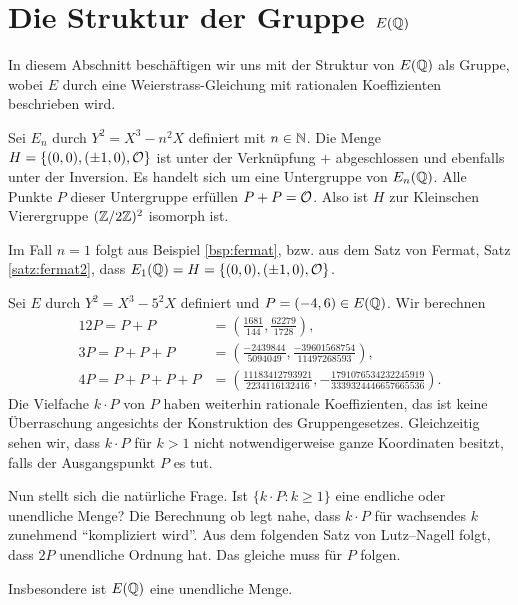 \section{Die Struktur der Gruppe $E({\mathbb{Q}})$}

In diesem Abschnitt beschäftigen wir uns mit der 
Struktur von $E({\mathbb{Q}})$ als Gruppe, wobei $E$ durch eine Weierstrass-Gleichung mit
rationalen Koeffizienten beschrieben wird. 


\begin{beispiel}
  \label{bsp:vierergruppe}
  Sei $E_n$ durch $Y^2 = X^3-n^2 X$ definiert mit $n\in{\mathbb{N}}$.
  Die Menge $H=\{(0,0),(\pm 1,0),{\mathcal O}\}$ ist unter der Verknüpfung $+$
  abgeschlossen
  und ebenfalls unter der Inversion.
  Es handelt sich um eine Untergruppe von $E_n({\mathbb{Q}})$.
  Alle
  Punkte $P$ dieser Untergruppe erfüllen $P+P={\mathcal O}$.  Also ist $H$ zur
  Kleinschen Vierergruppe $({\mathbb{Z}}/2{\mathbb{Z}})^2$ isomorph ist.
  
  Im Fall $n=1$ folgt aus Beispiel \ref{bsp:fermat}, bzw. aus dem Satz von Fermat, Satz
  \ref{satz:fermat2}, dass $E_1({\mathbb{Q}}) = H=  \{(0,0),(\pm 1,0),{\mathcal O}\}$. 
\end{beispiel}

\begin{beispiel}
  \label{bsp:multiplesofP}
  Sei $E$ durch $Y^2 = X^3-5^2X$ definiert und $P = (-4,6) \in
  E({\mathbb{Q}})$.
  Wir berechnen
  \begin{alignat*}1
    2P=P+P &= \left(\frac{1681}{144}, \frac{62279}{1728}\right),\\
    3P=P+P +P &= \left(\frac{-2439844}{5094049}, \frac{-39601568754}{11497268593} \right),\\
    4P= P+P +P+P &= \left( \frac{11183412793921}{2234116132416}, -\frac{1791076534232245919}{3339324446657665536}\right).
  \end{alignat*}
  Die Vielfache $k\cdot P$ von $P$ haben weiterhin rationale Koeffizienten,
  das ist keine Überraschung angesichts der Konstruktion des
  Gruppengesetzes. Gleichzeitig sehen wir, dass $k\cdot P$ für $k>1$ nicht
  notwendigerweise ganze Koordinaten besitzt, falls der Ausgangspunkt $P$
  es tut.

  Nun stellt sich die natürliche Frage. Ist $\{ k\cdot P : k\ge 1\}$ eine
  endliche oder unendliche Menge? Die Berechnung ob legt nahe, dass
  $k\cdot P$ für wachsendes $k$ zunehmend ``kompliziert wird''.
  Aus dem folgenden Satz von Lutz--Nagell folgt, dass $2P$ unendliche
  Ordnung hat. Das gleiche muss für $P$ folgen.

  Insbesondere ist $E({\mathbb{Q}})$ eine unendliche Menge. 
\end{beispiel}

